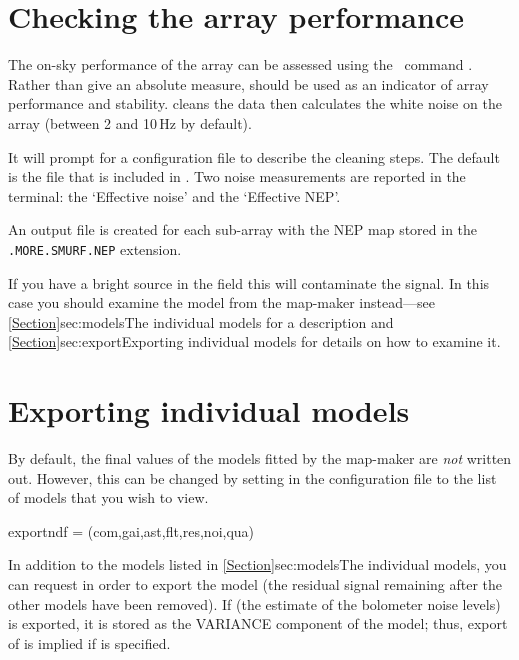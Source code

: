 \section{Checking the array performance}
\label{sec:calcnoise}

The on-sky performance of the array can be assessed using the \smurf\
command \calcnoise. Rather than give an absolute measure,
 should be used as an indicator of array performance
and stability.  \task{calcnoise} cleans the data then calculates the
white noise on the array (between 2 and 10\,Hz by default).
\begin{terminalv}
\end{terminalv}
It will prompt for a configuration file to describe the cleaning
steps. The default is the file
 that is
included in \smurf. Two noise measurements are reported in the terminal:
the `Effective noise' and the `Effective NEP'.

An output file is created for each sub-array with the NEP map stored
in the \texttt{.MORE.SMURF.NEP} extension.

If you have a bright source in the field this will contaminate the
signal. In this case you should examine the \model{NOI} model from the
map-maker instead---see \cref{Section}{sec:models}{The individual
  models} for a description and \cref{Section}{sec:export}{Exporting
  individual models} for details on how to examine it.

\section{Exporting individual models}
\label{sec:export}

By default, the final values of the models fitted by the map-maker are
\emph{not} written out. However, this can be changed by setting
 in the configuration file to the list of models
that you wish to view.

\begin{terminalv}
exportndf = (com,gai,ast,flt,res,noi,qua)
\end{terminalv}

In addition to the models listed in \cref{Section}{sec:models}{The
individual models}, you can request  in order to export the
\model{RES} model (the residual signal remaining after
the other models have been removed).  If  (the estimate of
the bolometer noise levels) is exported, it is stored as the VARIANCE
component of the  model; thus, export of \model{RES} is implied
if \model{NOI} is specified.

